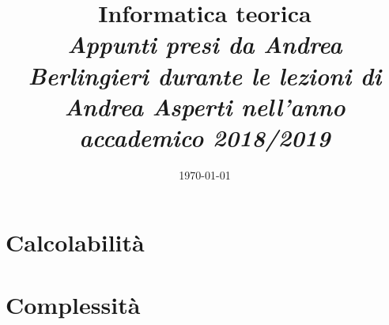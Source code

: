 \documentclass{report}
\begin{document}
\title{ Informatica teorica \\
        \normalsize \it Appunti presi da Andrea Berlingieri durante le lezioni di Andrea Asperti
        nell'anno accademico 2018/2019}
\date{\today}
\maketitle
\tableofcontents
%
\part{Calcolabilità}










\part{Complessità}


%
%
%
%
%
\end{document}
